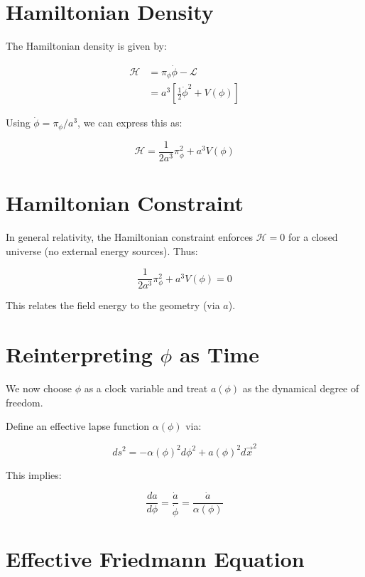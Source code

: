 \documentclass[12pt]{article}
\begin{document}
\section{Hamiltonian Density}

The Hamiltonian density is given by:

\begin{align}
\mathcal{H} &= \pi_\phi \dot{\phi} - \mathcal{L} \\
&= a^3 \left[ \frac{1}{2} \dot{\phi}^2 + V(\phi) \right]
\end{align}

Using $\dot{\phi} = \pi_\phi / a^3$, we can express this as:

\begin{equation}
\mathcal{H} = \frac{1}{2a^3} \pi_\phi^2 + a^3 V(\phi)
\end{equation}

\section{Hamiltonian Constraint}

In general relativity, the Hamiltonian constraint enforces $\mathcal{H} = 0$ for a closed universe (no external energy sources). Thus:

\begin{equation}
\frac{1}{2a^3} \pi_\phi^2 + a^3 V(\phi) = 0
\end{equation}

This relates the field energy to the geometry (via $a$).

\section{Reinterpreting $\phi$ as Time}

We now choose $\phi$ as a clock variable and treat $a(\phi)$ as the dynamical degree of freedom.

Define an effective lapse function $\alpha(\phi)$ via:

\begin{equation}
ds^2 = -\alpha(\phi)^2 d\phi^2 + a(\phi)^2 d\vec{x}^2
\end{equation}

This implies:

\begin{equation}
\frac{da}{d\phi} = \frac{\dot{a}}{\dot{\phi}} = \frac{\dot{a}}{\alpha(\phi)}
\end{equation}

\section{Effective Friedmann Equation}
\end{document}
